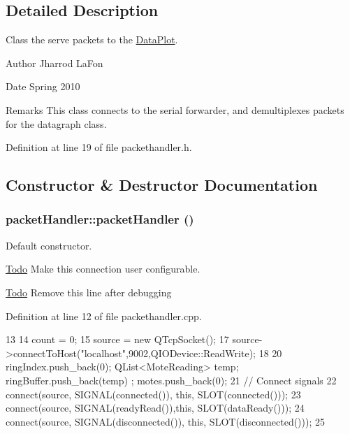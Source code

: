 \subsection{Detailed Description}
Class the serve packets to the \hyperlink{classDataPlot}{DataPlot}. \begin{DoxyAuthor}{Author}
Jharrod LaFon 
\end{DoxyAuthor}
\begin{DoxyDate}{Date}
Spring 2010 
\end{DoxyDate}
\begin{DoxyRemark}{Remarks}
This class connects to the serial forwarder, and demultiplexes packets for the datagraph class. 
\end{DoxyRemark}


Definition at line 19 of file packethandler.h.



\subsection{Constructor \& Destructor Documentation}
\hypertarget{classpacketHandler_a02936b9105618ed38701274efcfa0dfb}{
\subsubsection[{packetHandler}]{\setlength{\rightskip}{0pt plus 5cm}packetHandler::packetHandler ()}}
\label{classpacketHandler_a02936b9105618ed38701274efcfa0dfb}


Default constructor. 



\begin{Desc}
\item[\hyperlink{todo__todo000005}{Todo}]Make this connection user configurable. \end{Desc}


\begin{Desc}
\item[\hyperlink{todo__todo000006}{Todo}]Remove this line after debugging \end{Desc}




Definition at line 12 of file packethandler.cpp.




\begin{DoxyCode}
13 {
14     count = 0;
15     source = new QTcpSocket();
17     source->connectToHost("localhost",9002,QIODevice::ReadWrite);
18 
20     ringIndex.push_back(0);   QList<MoteReading> temp; ringBuffer.push_back(temp)
      ; motes.push_back(0);
21     // Connect signals
22     connect(source, SIGNAL(connected()), this, SLOT(connected()));
23     connect(source, SIGNAL(readyRead()),this, SLOT(dataReady()));
24     connect(source, SIGNAL(disconnected()), this, SLOT(disconnected()));
25 }
\end{DoxyCode}




